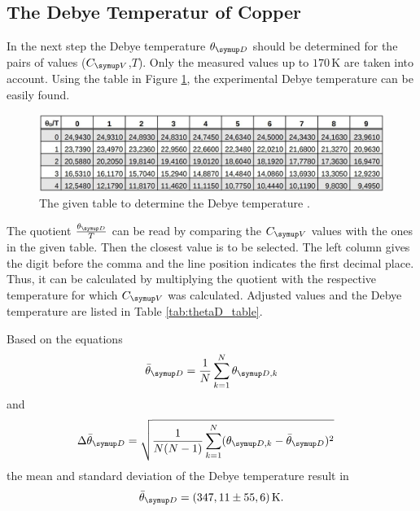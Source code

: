 
\restoregeometry




\subsection{The Debye Temperatur of Copper}
In the next step the Debye temperature $\theta\idx{D}$ should be determined for the pairs of values ($C\idx{V}$,$T$).
Only the measured values up to $170\,\unit{\kelvin}$ are taken into account. Using the table in Figure \ref{tab:thetaD_per_T},
the experimental Debye temperature can be easily found.  

\begin{figure}[h]
    \centering
    \includegraphics[scale=0.5]{thetaD_table.pdf}
    \caption{The given table to determine the Debye temperature \cite{V47}.}
    \label{tab:thetaD_per_T}
\end{figure}
\noindent
The quotient $\frac{\theta\idx{D}}{T}$ can be read by comparing the $C\idx{V}$ values with the ones in the given table. 
Then the closest value is to be selected. The left column gives the digit before the comma and the line position 
indicates the first decimal place. Thus, it can be calculated by multiplying the quotient with the respective 
temperature for which $C\idx{V}$ was calculated. Adjusted values and the Debye temperature are listed in 
Table \ref{tab:thetaD_table}. 



\noindent
Based on the equations 
\begin{equation*}
    \bar{\theta}\idx{D} = \frac{1}{N}\sum_{k = 1}^N \theta\idx{D,k}
\end{equation*}
and 
\begin{equation*}
    \Delta\bar{\theta}\idx{D} = \sqrt{\frac{1}{N(N-1)}\sum_{k = 1}^N(\theta\idx{D,k}-\bar{\theta}\idx{D})^2} \quad 
\end{equation*}
the mean and standard deviation of the Debye temperature result in 
\begin{equation*}
    \bar{\theta}\idx{D} = (347,11 \pm 55,6)\,\unit{\kelvin}.
\end{equation*}
 


